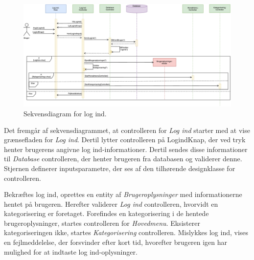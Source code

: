 \begin{figure} [H]
\centering
\includegraphics[width=1.55\textwidth, angle=90]{figures/Sek/SEKLogInd}
\caption{Sekvensdiagram for log ind.}
\label{fig:SEKlogind}
\end{figure}

\noindent
Det fremgår af sekvensdiagrammet, at controlleren for \textit{Log ind} starter med at vise grænsefladen for \textit{Log ind}. Dertil lytter controlleren på LogindKnap, der ved tryk henter brugerens angivne log ind-informationer. Dertil sendes disse informationer til \textit{Database} controlleren, der henter brugeren fra databasen og validerer denne. Stjernen definerer inputsparametre, der ses af den tilhørende designklasse for controlleren. 


Bekræftes log ind, oprettes en entity af \textit{Brugeroplysninger} med informationerne hentet på brugeren. Herefter validerer \textit{Log ind} controlleren, hvorvidt en kategorisering er foretaget. Forefindes en kategorisering i de hentede brugeroplysninger, startes controlleren for \textit{Hovedmenu}. Eksisterer kategoriseringen ikke, startes \textit{Kategorisering} controlleren. Mislykkes log ind, vises en fejlmeddelelse, der forsvinder efter kort tid, hvorefter brugeren igen har mulighed for at indtaste log ind-oplysninger. 
